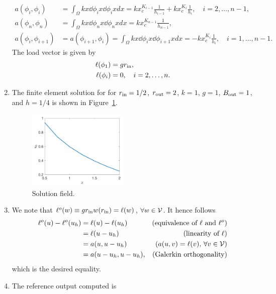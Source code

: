 \documentclass[preprint,11pt]{article}
\begin{document}
\begin{enumerate}
\begin{align*}
    a(\phi_i,\phi_i) &= \int_\Omega kx \dd{\phi_i}{x}\dd{\phi_i}{x} dx =  kx_c^{K_{i-1}} \frac{1}{h_{i-1}} + kx_c^{K_i} \frac{1}{h_i}, \quad i = 2, \dots, n-1, \\
    a(\phi_n,\phi_n) &= \int_\Omega kx \dd{\phi_n}{x}\dd{\phi_n}{x} dx = kx_c^{K_{n-1}} \frac{1}{h_{n-1}}, \\
    a(\phi_i,\phi_{i+1}) &= a(\phi_{i+1},\phi_i) =\int_\Omega kx \dd{\phi_i}{x} \dd{\phi_{i+1}}{x} dx = -k x_c^{K_i} \frac{1}{h_i}, \quad i = 1,\dots, n-1.
  \end{align*}
  The load vector is given by
  \begin{align*}
    \ell(\phi_1) &= g r_{\rm in}, \\
    \ell(\phi_i) &= 0, \quad i = 2,\dots, n.
  \end{align*}
\item The finite element solution for for $r_{\rm in} = 1/2$, $r_{\rm out} = 2$, $k = 1$, $g = 1$, $B_{\rm out} = 1$, and $h = 1/4$ is shown in Figure~\ref{fig:state}.
  \begin{figure}[!h]
    \centering
    \includegraphics[width=0.45\textwidth]{state}
    \caption{Solution field. \label{fig:state}}
  \end{figure}
\item We note that $\ell^o(w) \equiv gr_{\rm in} w(r_{\rm in}) = \ell(w)$, $\forall w \in \mathcal{V}$. It hence follows
  \begin{align*}
    \ell^o(u) - \ell^o(u_h)
    &= \ell(u) - \ell(u_h) & \text{(equivalence of $\ell$ and $\ell^o$)} \\
    &= \ell(u - u_h) & \text{(linearity of $\ell$)} \\
    &= a(u, u - u_h) & \text{($a(u,v) = \ell(v)$, $\forall v \in \mathcal{V}$)} \\
    &= a(u - u_h, u - u_h), & \text{(Galerkin orthogonality)}
  \end{align*}
  which is the desired equality.
\item
  The reference output computed is
  \begin{equation*}

\end{equation*}
\end{enumerate}
\end{document}
